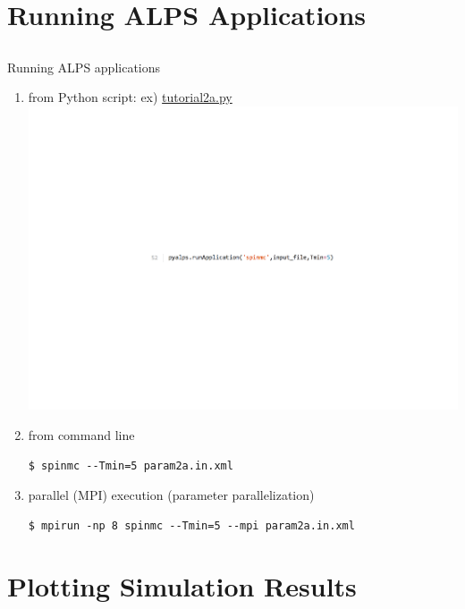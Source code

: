 \section{Running ALPS Applications}
\subsection*{\redm\whiteb\greenb}

\begin{frame}[t,fragile]{Running ALPS applications}
  \begin{enumerate}
  \item from Python script: ex) \href{https://github.com/cmsi/alps-tutorial/blob/tutorials/tutorials/mc-02-susceptibilities/tutorial2a.py}{tutorial2a.py}
    \includegraphics[height=.08\textheight]{tutorial2a-2.pdf}
  \item from command line
\begin{lstlisting}
$ spinmc --Tmin=5 param2a.in.xml
\end{lstlisting}
  \item parallel (MPI) execution (parameter parallelization)
\begin{lstlisting}
$ mpirun -np 8 spinmc --Tmin=5 --mpi param2a.in.xml
\end{lstlisting}
  \end{enumerate}
\end{frame}

\section{Plotting Simulation Results}
\subsection*{\redm\whiteb\greenb}

